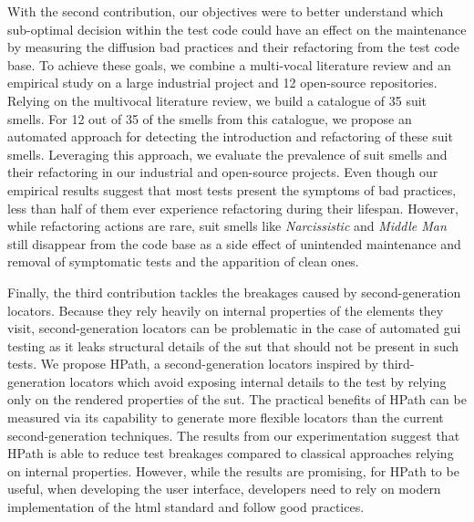 
With the second contribution, our objectives were to better understand which sub-optimal decision within the test code could have an effect on the maintenance by measuring the diffusion  bad practices and their refactoring from the test code base. To achieve these goals, we combine a multi-vocal literature review and an empirical study on a large industrial project and 12 open-source repositories.
Relying on the multivocal literature review, we build a catalogue of 35 \gls{suit} smells. For 12 out of 35 of the smells from this catalogue, we propose an automated approach for detecting the introduction and refactoring of these \gls{suit} smells. Leveraging this  approach, we evaluate the prevalence of \gls{suit} smells and their refactoring in our industrial and open-source projects. Even though our empirical results suggest that most tests present the symptoms of bad practices, less than half of them ever experience refactoring during their lifespan. However, while refactoring actions are rare, \gls{suit} smells like \emph{Narcissistic} and \emph{Middle Man} still disappear from the code base as a side effect of unintended maintenance and removal of symptomatic tests and the apparition of clean ones.

Finally, the third contribution tackles the breakages caused by second-generation locators. Because they rely heavily on internal properties of the elements they visit, second-generation locators can be problematic in the case of automated \gls{gui} testing as it leaks structural details of the \gls{sut} that should not be present in such tests. We propose HPath, a second-generation locators inspired by third-generation locators which avoid exposing internal details to the test by relying only on the rendered properties of the \gls{sut}. The practical benefits of HPath can be measured via its capability to generate more flexible locators than the current second-generation techniques. The results from our experimentation suggest that HPath is able to reduce test breakages compared to classical approaches relying on internal properties. However, while the results are promising, for HPath to be useful, when developing the user interface, developers need to rely on modern implementation of the \gls{html} standard and follow good practices.

